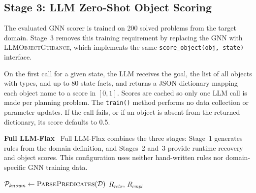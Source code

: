 \documentclass{ieeeaccess}
\newcommand{\myparagraph}[1]{\noindent\textbf{#1}~}
\newcommand{\method}{LLM-Flax\xspace}
\newcommand{\fullmethod}{Full LLM-Flax\xspace}
\begin{document}
\subsection{Stage 3: LLM Zero-Shot Object Scoring}
\label{sec:stage3}

The evaluated GNN scorer is trained on 200 solved problems from the target domain.
Stage~3 removes this training requirement by replacing the GNN with \textsc{LLMObjectGuidance}, which implements the same \texttt{score\_object(obj, state)} interface.

On the first call for a given state, the LLM receives the goal, the list of all objects with types, and up to 80 state facts, and returns a JSON dictionary mapping each object name to a score in $[0, 1]$.
Scores are cached so only one LLM call is made per planning problem.
The \texttt{train()} method performs no data collection or parameter updates.
If the call fails, or if an object is absent from the returned dictionary, its score defaults to 0.5.

\myparagraph{Full LLM-Flax}
\fullmethod combines the three stages: Stage~1 generates rules from the domain definition, and Stages~2 and~3 provide runtime recovery and object scores.
This configuration uses neither hand-written rules nor domain-specific GNN training data.

\begin{algorithm}[t]
\caption{\method Rule Generation (Stage 1)}
\label{alg:gen}
\BlankLine
$\mathcal{P}_{known} \leftarrow \textsc{ParsePredicates}(\mathcal{D})$\;
\Return $R_{relx},\, R_{cmpl}$\;
\end{algorithm}
\end{document}
